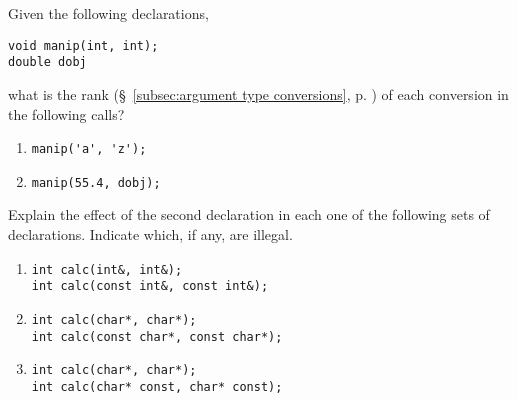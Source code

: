 %
%
\begin{question}
Given the following declarations,
\begin{lstlisting}
void manip(int, int);
double dobj
\end{lstlisting}
what is the rank (\S~\ref{subsec:argument type conversions}, p. \pageref{subsec:argument type conversions}) of each conversion in the following calls?
\begin{enumerate}[label=(\alph*)]
^^I\item \verb|manip('a', 'z');|
^^I\item \verb|manip(55.4, dobj);|
\end{enumerate}
\end{question}

\begin{question}
Explain the effect of the second declaration in each one of
the following sets of declarations. Indicate which, if any, are illegal.
\begin{enumerate}[label=(\alph*)]
^^I\item
\begin{lstlisting}
int calc(int&, int&);
int calc(const int&, const int&);
\end{lstlisting}

^^I\item
\begin{lstlisting}
int calc(char*, char*);
int calc(const char*, const char*);
\end{lstlisting}

^^I\item
\begin{lstlisting}
int calc(char*, char*);
int calc(char* const, char* const);
\end{lstlisting}
\end{enumerate}
\end{question}
